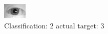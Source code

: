 \begin{figure}[h!]
\begin{center}
\includegraphics[width=0.60\columnwidth]{figures/ID1059_class_2_target_3.png}
\end{center}
\caption{ Classification: 2 actual target: 3}
\label{fig:ID1059_class_2_target_3}
\end{figure}

